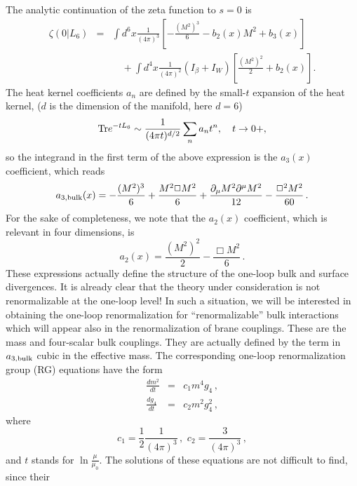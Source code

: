 \documentclass[a4paper,aps,prl,preprint,groupedaddress,showpacs,nobibnotes,tightenlines]{revtex4}
\begin{document}
The analytic continuation of the zeta function to $s=0$ is
\begin{eqnarray}
\zeta(0|L_6)&=&\int d^6x \frac{1}{(4\pi)^3}  
\left[-\frac{(M^2)^3}{6}-b_2(x)M^2+b_3(x)
\right]\nonumber\\
&&\quad\mbox{}+\int
 d^4x \frac{1}{(4\pi)^2}(I_\beta+I_W)\left[\frac{(M^2)^2}{2}+b_2(x)\right].
\end{eqnarray}
The heat kernel coefficients $a_n$
 are defined by the small-$t$ expansion of the
heat kernel, ($d$ is the dimension of the manifold, here $d=6$)
\begin{equation}
\mbox{Tr}e^{-tL_6}\sim{1\over(4\pi t)^{d/2}}\sum_na_nt^n,\quad t\to 0+,
\end{equation}
 so the integrand in the first term of the above expression is the $a_3(x)$ 
coefficient, which reads
\begin{equation}
a_{3,{\rm bulk}}(x)
=-\frac{(M^2)^3}{6}+\frac{M^2 \Box M^2}{6}+
\frac{\partial_\mu M^2\partial^\mu M^2}{12}-\frac{ \Box^2 M^2}{60}\,.
\label{a3}
\end{equation}
For the sake of completeness, we note that
the $a_2(x)$ coefficient, which is relevant in four dimensions, is
\begin{equation}
a_{2}(x)=\frac{(M^2)^2}{2}-\frac{\Box M^2}{6}\,.
\label{a2}
\end{equation}
These  expressions actually define the structure of the one-loop bulk 
and surface divergences.
It is already clear that the theory under consideration is not 
renormalizable  at the one-loop level! In such a situation, we will be 
interested in obtaining the one-loop renormalization for ``renormalizable''
bulk interactions which will appear also in 
the renormalization of brane couplings. These are the mass and 
four-scalar bulk couplings.
They are actually defined by the term in $a_{3,{\rm bulk}}$
cubic in the effective mass.
The corresponding one-loop renormalization group (RG) equations have the form
\begin{subequations}
\begin{eqnarray}
\frac{dm^2}{dt}&=&c_1 m^4 g_4\,,\\
\frac{ dg_4}{dt}&=&c_2 m^2 g_4^2\,,
\end{eqnarray}
\end{subequations}
where 
\begin{equation}
c_1=\frac{1}{2}\frac{1}{(4\pi)^3}\,,\,\,c_2=\frac{3}{(4\pi)^3}\,,
\end{equation}
and $t$  stands for $ \ln \frac{\mu}{\mu_0}$. 
The solutions of these equations are not difficult to find, since their 
\end{document}
